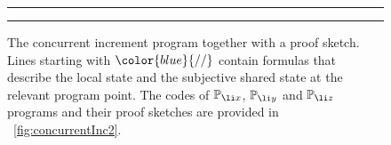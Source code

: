 \begin{figure}
\centering
\noindent\hrule\vspace{5pt}
%		
%    
\vspace{3pt}\hrule
\caption{The concurrent increment program together with a \colosl proof sketch. Lines starting with $\color{blue}{//}$ contain formulas that describe  the local state and the subjective shared state at the relevant program point. The codes of $\mathbb{P}_{\li x}$, $\mathbb{P}_{\li y}$ and $\mathbb{P}_{\li z}$ programs and their proof sketches are provided in \fig~\ref{fig:concurrentInc2}.}
\label{fig:concurrentInc}
\end{figure}
